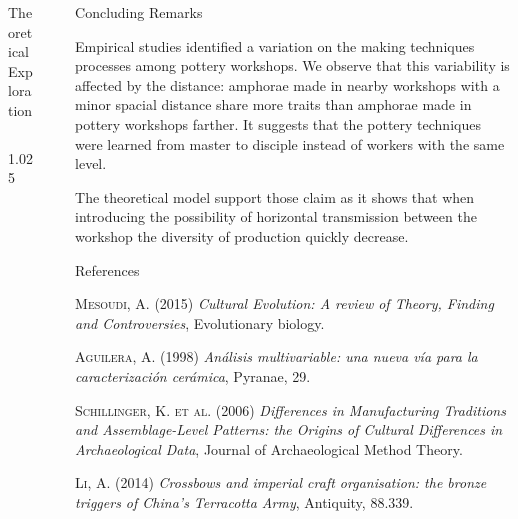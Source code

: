 \documentclass[final]{beamer}
\newlength{\sepwid}
\newlength{\onecolwid}
\newlength{\twocolwid}
\begin{document}
\begin{frame}[t]
\begin{columns}[t]
\begin{column}{\twocolwid}
\begin{block}{Theoretical Exploration}
\begin{columns}[t,totalwidth=\twocolwid]
\begin{column}{1.025\onecolwid}
    
\end{column}
\end{columns}

\end{block}
\end{column}


\begin{column}{\sepwid}\end{column} %

\begin{column}{\onecolwid} %

\begin{block}{Concluding Remarks}

Empirical studies identified a variation on the making techniques processes among pottery workshops. We observe that this variability is affected by the distance: amphorae made in nearby workshops with a minor spacial distance share more traits than amphorae made in pottery workshops farther. It suggests that the pottery techniques were learned from master to disciple instead of workers with the same level. 

The theoretical model support those claim as it shows that when introducing the possibility of horizontal transmission between the workshop the diversity of production quickly decrease.
 
\end{block}

\begin{block}{References}
\small

\begin{thebibliography}{50}

\textsc{Mesoudi, A. (2015)}
\textit{Cultural Evolution: A review of Theory, Finding and Controversies}, Evolutionary biology.

\textsc{Aguilera, A. (1998)}
\textit{An\'alisis multivariable: una nueva v\'ia para la caracterizaci\'on cer\'amica}, Pyranae, 29.

\textsc{Schillinger, K. et al. (2006)}
\textit{Differences in Manufacturing Traditions and Assemblage-Level Patterns: the Origins of Cultural Differences in Archaeological Data}, Journal of Archaeological Method Theory.

\textsc{Li, A. (2014)}
\textit{Crossbows and imperial craft organisation: the bronze triggers of China's Terracotta Army}, Antiquity, 88.339.


\end{thebibliography}
\end{block}
\end{column}
\end{columns}
\end{frame}
\end{document}
